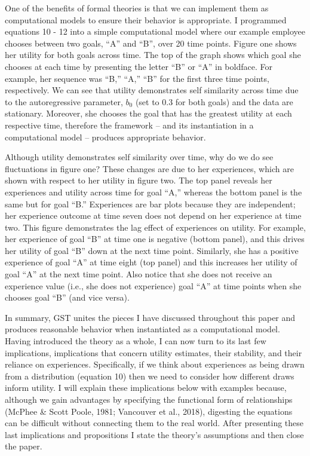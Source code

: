 \documentclass[english,,man]{apa6}
\theoremstyle{definition}
\theoremstyle{definition}
\theoremstyle{definition}
\theoremstyle{remark}
\begin{document}
One of the benefits of formal theories is that we can implement them as
computational models to ensure their behavior is appropriate. I
programmed equations 10 - 12 into a simple computational model where our
example employee chooses between two goals, \enquote{A} and \enquote{B},
over 20 time points. Figure one shows her utility for both goals across
time. The top of the graph shows which goal she chooses at each time by
presenting the letter \enquote{B} or \enquote{A} in boldface. For
example, her sequence was \enquote{B,} \enquote{A,} \enquote{B} for the
first three time points, respectively. We can see that utility
demonstrates self similarity across time due to the autoregressive
parameter, \(b_0\) (set to 0.3 for both goals) and the data are
stationary. Moreover, she chooses the goal that has the greatest utility
at each respective time, therefore the framework -- and its
instantiation in a computational model -- produces appropriate behavior.

Although utility demonstrates self similarity over time, why do we do
see fluctuations in figure one? These changes are due to her
experiences, which are shown with respect to her utility in figure two.
The top panel reveals her experiences and utility across time for goal
\enquote{A,} whereas the bottom panel is the same but for goal
\enquote{B.} Experiences are bar plots because they are independent; her
experience outcome at time seven does not depend on her experience at
time two. This figure demonstrates the lag effect of experiences on
utility. For example, her experience of goal \enquote{B} at time one is
negative (bottom panel), and this drives her utility of goal \enquote{B}
down at the next time point. Similarly, she has a positive experience of
goal \enquote{A} at time eight (top panel) and this increases her
utility of goal \enquote{A} at the next time point. Also notice that she
does not receive an experience value (i.e., she does not experience)
goal \enquote{A} at time points when she chooses goal \enquote{B} (and
vice versa).

In summary, GST unites the pieces I have discussed throughout this paper
and produces reasonable behavior when instantiated as a computational
model. Having introduced the theory as a whole, I can now turn to its
last few implications, implications that concern utility estimates,
their stability, and their reliance on experiences. Specifically, if we
think about experiences as being drawn from a distribution (equation 10)
then we need to consider how different draws inform utility. I will
explain these implications below with examples because, although we gain
advantages by specifying the functional form of relationships (McPhee \&
Scott Poole, 1981; Vancouver et al., 2018), digesting the equations can
be difficult without connecting them to the real world. After presenting
these last implications and propositions I state the theory's
assumptions and then close the paper.
\end{document}
